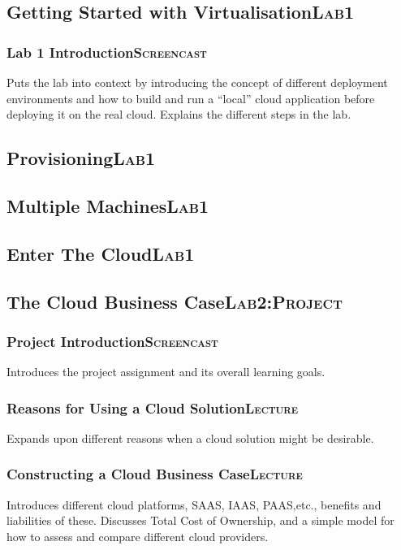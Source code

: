 \documentclass[11pt]{article}
\begin{document}
\subsection[Getting Started with Virtualisation]{Getting Started with Virtualisation\hfill{}\textsc{Lab1}}
\label{sec-3-2}
\subsubsection[Lab 1 Introduction]{Lab 1 Introduction\hfill{}\textsc{Screencast}}
\label{sec-3-2-1}
Puts the lab into context by introducing the concept of different deployment environments and how to build and run a ``local'' cloud application before deploying it on the real cloud. Explains the different steps in the lab.
\subsection[Provisioning]{Provisioning\hfill{}\textsc{Lab1}}
\label{sec-3-3}
\subsection[Multiple Machines]{Multiple Machines\hfill{}\textsc{Lab1}}
\label{sec-3-4}
\subsection[Enter The Cloud]{Enter The Cloud\hfill{}\textsc{Lab1}}
\label{sec-3-5}
\subsection[The Cloud Business Case]{The Cloud Business Case\hfill{}\textsc{Lab2:Project}}
\label{sec-3-6}
\subsubsection[Project Introduction]{Project Introduction\hfill{}\textsc{Screencast}}
\label{sec-3-6-1}
Introduces the project assignment and its overall learning goals.
\subsubsection[Reasons for Using a Cloud Solution]{Reasons for Using a Cloud Solution\hfill{}\textsc{Lecture}}
\label{sec-3-6-2}
Expands upon different reasons when a cloud solution might be desirable.
\subsubsection[Constructing a Cloud Business Case]{Constructing a Cloud Business Case\hfill{}\textsc{Lecture}}
\label{sec-3-6-3}
Introduces different cloud platforms, SAAS, IAAS, PAAS,etc., benefits and liabilities of these.
Discusses Total Cost of Ownership, and a simple model for how to assess and compare different cloud providers.
\end{document}
